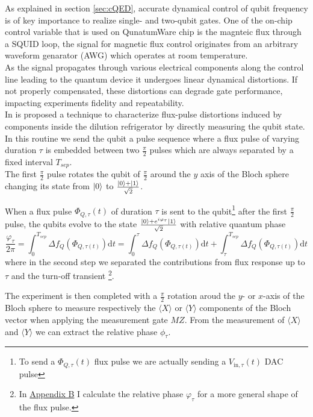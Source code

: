 As explained in section \ref{sec:cQED}, accurate dynamical control of qubit frequency is of key importance to realize single- and two-qubit gates.
One of the on-chip control variable that is used on QunatumWare chip is the magnteic flux through a SQUID loop, the signal for magnetic flux control originates from an arbitrary waveform genarator (AWG) which operates at room temperature.\\
As the signal propagates through various electrical components along the control line leading to the quantum device it undergoes linear dynamical distortions. 
If not properly compensated, these distortions can degrade gate performance, impacting experiments fidelity and repeatability.\\

In \cite{rol_time-domain_2020} is proposed a technique to characterize flux-pulse distortions induced by components inside the dilution refrigerator by directly measuring the qubit state.
In this routine we send the qubit a pulse sequence where a flux pulse of varying duration $\tau$ is embedded between two $\frac{\pi}{2}$ pulses which are always separated by a fixed interval $T_{sep}$.\\
The first $\frac{\pi}{2}$ pulse rotates the qubit of $\frac{\pi}{2}$ around the $y$ axis of the Bloch sphere changing its state from $\ket{0}$ to $\frac{\ket{0}+\ket{1}}{\sqrt{2}}$.

When a flux pulse $\Phi_{Q,\tau}(t)$ of duration $\tau$ is sent to the qubit\footnote{To send a $\Phi_{Q,\tau}(t)$ flux pulse we are actually sending a $V_{\text{in},\tau}(t)$ DAC pulse} after the first $\frac{\pi}{2}$ pulse, the qubits evolve to the state $\frac{\ket{0}+e^{i\varphi_\tau}\ket{1}}{\sqrt{2}}$ with relative quantum phase 
\begin{equation}\label{eq:phi}
    \frac{\varphi_{\tau}}{2\pi} = \int_{0}^{T_{sep}} \Delta f_Q (\Phi_{Q,\tau(t)})\text{d}t = \int_{0}^{\tau} \Delta f_Q (\Phi_{Q,\tau(t)})\text{d}t + \int_{\tau}^{T_{sep}} \Delta f_Q (\Phi_{Q,\tau(t)})\text{d}t
\end{equation}
where in the second step we separated the contributions from flux response up to $\tau$ and the turn-off transient \footnote{In \hyperref[app:AppendixB]{Appendix B} I calculate the relative phase $\varphi_{\tau}$ for a more general shape of the flux pulse.}. 

The experiment is then completed with a $\frac{\pi}{2}$ rotation aroud the $y$- or $x$-axis of the Bloch sphere to measure respectively the $\langle X \rangle$ or $\langle Y \rangle$ components of the Bloch vector when applying the measurement gate $MZ$. 
From the measurement of $\langle X \rangle$ and $\langle Y \rangle$ we can extract the relative phase $\phi_{\tau}$.\\

